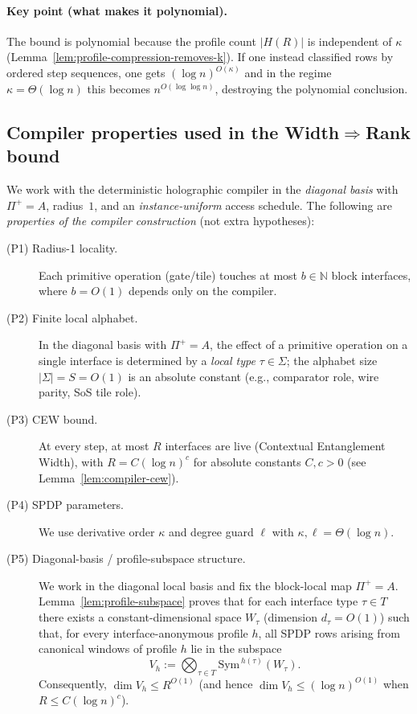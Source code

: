 \documentclass[12pt]{article}
\theoremstyle{definition}
\theoremstyle{definition}
\theoremstyle{remark}
\theoremstyle{remark}
\begin{document}
\paragraph{Key point (what makes it polynomial).}
The bound is polynomial because the profile count $|H(R)|$ is independent of $\kappa$
(Lemma~\ref{lem:profile-compression-removes-k}). If one instead classified rows by
ordered step sequences, one gets $(\log n)^{O(\kappa)}$ and in the regime
$\kappa=\Theta(\log n)$ this becomes $n^{O(\log\log n)}$, destroying the polynomial conclusion.

\subsection{Compiler properties used in the Width$\Rightarrow$Rank bound}

We work with the deterministic holographic compiler in the \emph{diagonal basis} with $\Pi^+=A$,
radius~$1$, and an \emph{instance-uniform} access schedule.
The following are \emph{properties of the compiler construction} (not extra hypotheses):

\begin{description}
\item[(P1) Radius-1 locality.] Each primitive operation (gate/tile) touches at most $b\in\mathbb{N}$
block interfaces, where $b=O(1)$ depends only on the compiler.

\item[(P2) Finite local alphabet.] In the diagonal basis with $\Pi^+=A$, the effect of a primitive
operation on a single interface is determined by a \emph{local type} $\tau\in\Sigma$; the alphabet size
$|\Sigma|=S=O(1)$ is an absolute constant (e.g., comparator role, wire parity, SoS tile role).

\item[(P3) CEW bound.] At every step, at most $R$ interfaces are live (Contextual Entanglement Width), with
$R=C(\log n)^c$ for absolute constants $C,c>0$ (see Lemma~\ref{lem:compiler-cew}).

\item[(P4) SPDP parameters.] We use derivative order $\kappa$ and degree guard $\ell$ with
$\kappa,\ell=\Theta(\log n)$.

\item[(P5) Diagonal-basis / profile-subspace structure.]
We work in the diagonal local basis and fix the block-local map $\Pi^+ = A$.
Lemma~\ref{lem:profile-subspace} proves that for each interface type $\tau \in T$
there exists a constant-dimensional space $W_\tau$ (dimension $d_\tau = O(1)$)
such that, for every interface-anonymous profile $h$, all SPDP rows arising from
canonical windows of profile $h$ lie in the subspace
\[
V_h := \bigotimes_{\tau \in T} \mathrm{Sym}^{\,h(\tau)}(W_\tau).
\]
Consequently, $\dim V_h \le R^{O(1)}$ (and hence $\dim V_h \le (\log n)^{O(1)}$
when $R \le C(\log n)^c$).
\end{description}
\end{document}
